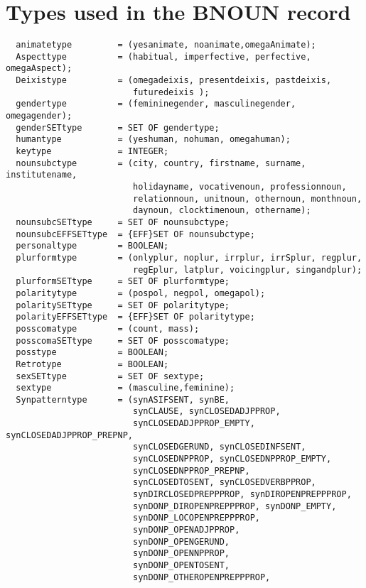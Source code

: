 \section{Types used in the BNOUN record}
\begin{verbatim}
  animatetype         = (yesanimate, noanimate,omegaAnimate);
  Aspecttype          = (habitual, imperfective, perfective, omegaAspect);
  Deixistype          = (omegadeixis, presentdeixis, pastdeixis,
                         futuredeixis );                     
  gendertype          = (femininegender, masculinegender, omegagender);
  genderSETtype       = SET OF gendertype;               
  humantype           = (yeshuman, nohuman, omegahuman);  
  keytype             = INTEGER;
  nounsubctype        = (city, country, firstname, surname, institutename,
                         holidayname, vocativenoun, professionnoun, 
                         relationnoun, unitnoun, othernoun, monthnoun, 
                         daynoun, clocktimenoun, othername);
  nounsubcSETtype     = SET OF nounsubctype;
  nounsubcEFFSETtype  = {EFF}SET OF nounsubctype;
  personaltype        = BOOLEAN;
  plurformtype        = (onlyplur, noplur, irrplur, irrSplur, regplur, 
                         regEplur, latplur, voicingplur, singandplur);
  plurformSETtype     = SET OF plurformtype;
  polaritytype        = (pospol, negpol, omegapol);
  polaritySETtype     = SET OF polaritytype;             
  polarityEFFSETtype  = {EFF}SET OF polaritytype;         
  posscomatype        = (count, mass);
  posscomaSETtype     = SET OF posscomatype;
  posstype            = BOOLEAN;
  Retrotype           = BOOLEAN;   
  sexSETtype          = SET OF sextype;
  sextype             = (masculine,feminine);
  Synpatterntype      = (synASIFSENT, synBE, 
                         synCLAUSE, synCLOSEDADJPPROP, 
                         synCLOSEDADJPPROP_EMPTY, synCLOSEDADJPPROP_PREPNP, 
                         synCLOSEDGERUND, synCLOSEDINFSENT, 
                         synCLOSEDNPPROP, synCLOSEDNPPROP_EMPTY, 
                         synCLOSEDNPPROP_PREPNP,               
                         synCLOSEDTOSENT, synCLOSEDVERBPPROP,
                         synDIRCLOSEDPREPPPROP, synDIROPENPREPPPROP,
                         synDONP_DIROPENPREPPPROP, synDONP_EMPTY,
                         synDONP_LOCOPENPREPPPROP, 
                         synDONP_OPENADJPPROP, 
                         synDONP_OPENGERUND,   
                         synDONP_OPENNPPROP, 
                         synDONP_OPENTOSENT, 
                         synDONP_OTHEROPENPREPPPROP,       

\end{verbatim}
